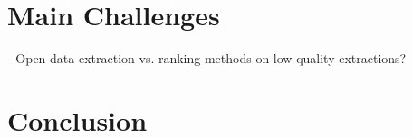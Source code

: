 \section{Main Challenges}\label{sec:challenges}
- Open data extraction vs. ranking methods on low quality extractions?

\section{Conclusion}\label{sec:conclusion}
